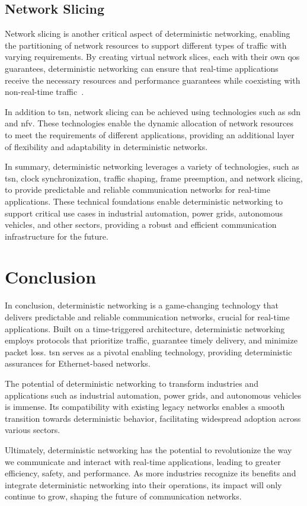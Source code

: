\documentclass[runningheads]{llncs}
\begin{document}
\subsection*{Network Slicing}
Network slicing is another critical aspect of deterministic networking, enabling the partitioning of network resources to support different types of traffic with varying requirements. By creating virtual network slices, each with their own \gls{qos} guarantees, deterministic networking can ensure that real-time applications receive the necessary resources and performance guarantees while coexisting with non-real-time traffic~\cite{ietf-teas-ietf-network-slices-19}.

In addition to \gls{tsn}, network slicing can be achieved using technologies such as \gls{sdn} and \gls{nfv}. These technologies enable the dynamic allocation of network resources to meet the requirements of different applications, providing an additional layer of flexibility and adaptability in deterministic networks.

In summary, deterministic networking leverages a variety of technologies, such as \gls{tsn}, clock synchronization, traffic shaping, frame preemption, and network slicing, to provide predictable and reliable communication networks for real-time applications. These technical foundations enable deterministic networking to support critical use cases in industrial automation, power grids, autonomous vehicles, and other sectors, providing a robust and efficient communication infrastructure for the future.

\section{Conclusion}

In conclusion, deterministic networking is a game-changing technology that delivers predictable and reliable communication networks, crucial for real-time applications. Built on a time-triggered architecture, deterministic networking employs protocols that prioritize traffic, guarantee timely delivery, and minimize packet loss. \gls{tsn} serves as a pivotal enabling technology, providing deterministic assurances for Ethernet-based networks.

The potential of deterministic networking to transform industries and applications such as industrial automation, power grids, and autonomous vehicles is immense. Its compatibility with existing legacy networks enables a smooth transition towards deterministic behavior, facilitating widespread adoption across various sectors.

Ultimately, deterministic networking has the potential to revolutionize the way we communicate and interact with real-time applications, leading to greater efficiency, safety, and performance. As more industries recognize its benefits and integrate deterministic networking into their operations, its impact will only continue to grow, shaping the future of communication networks.

\printnoidxglossary[type=acronym,sort=letter,title=Abbreviations]



\end{document}
